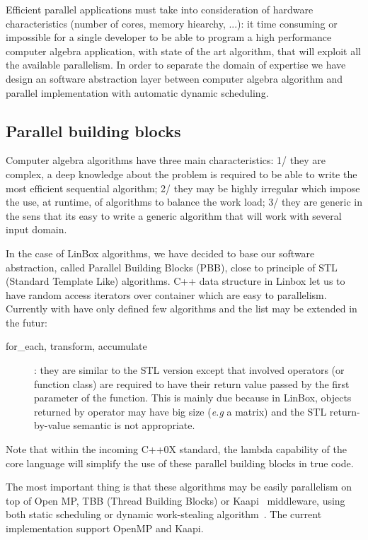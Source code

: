 \documentclass[runningheads,a4paper]{llncs}
\begin{document}
Efficient parallel applications must take into consideration of hardware characteristics (number of cores, memory hiearchy, ...): it time consuming or impossible for a single developer to be able to program a high performance computer algebra application, with state of the art algorithm, that will exploit all the available parallelism. 
In order to separate the domain of expertise we have design an software abstraction layer between computer algebra algorithm and parallel implementation with automatic dynamic scheduling.

\subsection{Parallel building blocks}
Computer algebra algorithms have three main characteristics: 1/ they are complex, a deep knowledge about the problem is required to be able to write the most efficient sequential algorithm; 2/ they may be highly irregular which impose the use, at runtime, of algorithms to balance the work load; 3/ they are generic in the sens that its easy to write a generic algorithm that will work with several input domain.

  In the case of LinBox algorithms, we have decided to base our software abstraction, called Parallel Building Blocks (PBB), close to principle of STL (Standard Template Like) algorithms. C++ data structure in Linbox let us to have random access iterators over container which are easy to parallelism. Currently with have only defined few algorithms and the list may be extended in the futur:
\begin{description} 
\item [for\_each, transform, accumulate]: they are similar to the STL version except that involved operators (or function class) are required to have their return value passed by the first parameter of the function. This is mainly due because in LinBox,  objects returned by operator may have big size (\textit{e.g} a matrix) and the STL return-by-value semantic is not appropriate. 
\end{description} 
Note that within the incoming C++0X standard, the lambda capability of the core language will simplify the use of these parallel building blocks in true code.


The most important thing is that these algorithms may be easily parallelism on top of Open MP, %
TBB (Thread Building Blocks)%
or Kaapi~\cite{inproceedingsgautier.gbp_ktsrsf_07} middleware, using both static scheduling or dynamic work-stealing algorithm~\cite{con-traore.trmgb_08}.
The current implementation support OpenMP and Kaapi.
\end{document}
